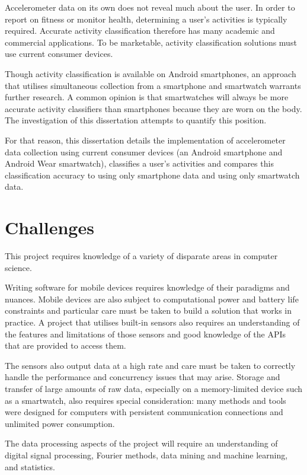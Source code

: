     Accelerometer data on its own does not reveal much about the user. In order to report on  
    fitness or monitor health, determining a user's activities is typically required. Accurate activity classification therefore has many academic and commercial applications. To be
    marketable, activity classification solutions must use current consumer devices.
    
    Though 
    activity classification is available on Android smartphones, an approach that
    utilises simultaneous collection from a smartphone and smartwatch warrants further research. A common opinion is that smartwatches will always be more accurate activity classifiers than smartphones because they are worn on the body. The investigation of this dissertation attempts to quantify this position.
     
    For that reason, this dissertation details the implementation of accelerometer data collection using current 
    consumer devices (an Android smartphone and Android Wear smartwatch), classifies a user's 
    activities and compares this classification accuracy to using only smartphone data and using 
    only smartwatch data. 
    
  \section{Challenges}
  \label{sec:intro-challenges}
    This project requires knowledge of a variety of disparate areas in computer science. 
    
    Writing software for mobile devices requires knowledge of their paradigms and nuances.
    Mobile devices are also subject to computational power and battery life constraints\cite{rachuri2011sociablesense} and   
    particular care must be taken to build a solution that works in practice.  
    A project that utilises built-in sensors also requires an understanding of the features and 
    limitations of those sensors and good knowledge of the APIs that are provided to access them.

    The sensors also output data at a high rate and care must be taken to correctly handle the
    performance and concurrency issues that may arise. Storage and transfer of large amounts of
    raw data, especially on a memory-limited device such as a smartwatch, also requires special
    consideration: many methods and tools were designed for computers with persistent communication connections and unlimited power consumption.
    
    The data processing aspects of the project will require an understanding of digital signal 
    processing, Fourier methods, data mining and machine learning, and statistics.

